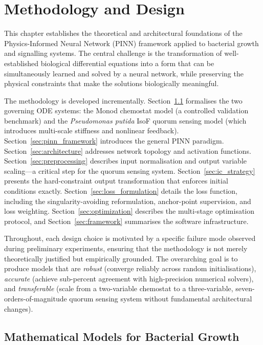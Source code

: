 \documentclass[14pt,a4paper,openany]{extbook}
\begin{document}
\chapter{Methodology and Design}
\label{chap:methodology}

This chapter establishes the theoretical and architectural foundations of the
Physics-Informed Neural Network (PINN) framework applied to bacterial growth
and signalling systems.  The central challenge is the transformation of
well-established biological differential equations into a form that can be
simultaneously learned and solved by a neural network, while preserving the
physical constraints that make the solutions biologically meaningful.

The methodology is developed incrementally.
Section~\ref{sec:math_models} formalises the two governing ODE systems:
the Monod chemostat model (a controlled validation benchmark) and the
\textit{Pseudomonas putida} IsoF quorum sensing model (which introduces
multi-scale stiffness and nonlinear feedback).
Section~\ref{sec:pinn_framework} introduces the general PINN paradigm.
Section~\ref{sec:architecture} addresses network topology and activation
functions.
Section~\ref{sec:preprocessing} describes input normalisation and output
variable scaling---a critical step for the quorum sensing system.
Section~\ref{sec:ic_strategy} presents the hard-constraint output
transformation that enforces initial conditions exactly.
Section~\ref{sec:loss_formulation} details the loss function, including the
singularity-avoiding reformulation, anchor-point supervision, and loss
weighting.
Section~\ref{sec:optimization} describes the multi-stage optimisation
protocol, and Section~\ref{sec:framework} summarises the software
infrastructure.

Throughout, each design choice is motivated by a specific failure mode
observed during preliminary experiments, ensuring that the methodology is
not merely theoretically justified but empirically grounded.  The
overarching goal is to produce models that are \emph{robust} (converge
reliably across random initialisations), \emph{accurate} (achieve
sub-percent agreement with high-precision numerical solvers), and
\emph{transferable} (scale from a two-variable chemostat to a
three-variable, seven-orders-of-magnitude quorum sensing system without
fundamental architectural changes).


\section{Mathematical Models for Bacterial Growth}
\label{sec:math_models}
\end{document}
